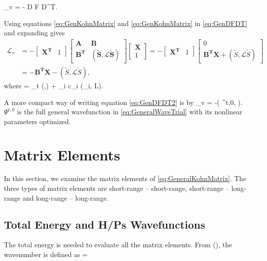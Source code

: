 \documentclass[Dissertation.tex]{subfiles}
\begin{document}
\beq
\label{eq:GenDFDT}
_v = - D F D^T.
\eeq

\noindent Using equations \ref{eq:GenKohnMatrix} and \ref{eq:GenKohnMatrix} in \ref{eq:GenDFDT} and expanding gives
\begin{align}
\label{eq:GenDFDT2}
\nonumber \mathcal{L}_v &= - 
\begin{bmatrix}
\boldsymbol{X^T} & 1 
\end{bmatrix}
\begin{bmatrix}
\boldsymbol{A} & \boldsymbol{B} \\
\boldsymbol{B^T} & \boldsymbol{(\tilde{S},\mathcal{L}\tilde{S})}
\end{bmatrix}
\begin{bmatrix}
\boldsymbol{X} \\
1
\end{bmatrix}
= -
\begin{bmatrix}
\boldsymbol{X^T} & 1 
\end{bmatrix}
\begin{bmatrix}
0 \\
\boldsymbol{B^T X} + (\tilde{S},\mathcal{L}\tilde{S})
\end{bmatrix} \\
&= -\boldsymbol{B^T X} - (\tilde{S},\mathcal{L}\tilde{S}),
\end{align}
where
\beq
{} = _t (,) + \sum_i c_i (\tilde{\phi}_i, L).
\eeq

\noindent A more compact way of writing equation \ref{eq:GenDFDT2} is by
\beq
{}_v = -\left( \Psi^{t,0},  \right).
\eeq
$\Psi^{t,0}$ is the full general wavefunction in \cref{eq:GeneralWaveTrial} with its nonlinear parameters optimized.



\section{Matrix Elements}
In this section, we examine the matrix elements of \cref{eq:GeneralKohnMatrix}. The three types of matrix elements are short-range -- short-range, short-range -- long-range and long-range -- long-range.

\subsection{Total Energy and H/Ps Wavefunctions}
The total energy is needed to evaluate all the matrix elements. From (\cite{}), the wavenumber is defined as
\beq
\kappa = 
\label{eq:Wavenumber}
\eeq
\end{document}
